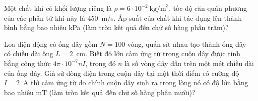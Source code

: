 	\begin{ex}%
		Một chất khí có khối lượng riêng là $\rho=6\cdot 10^{-2}~\text{kg/m}^3$, tốc độ căn quân phương của các phân tử khí này là $450$~m/s. Áp suất của chất khí tác dụng lên thành bình bằng bao nhiêu kPa (làm tròn kết quả đến chữ số hàng phần trăm)?
		\par
	\end{ex}

	\begin{ex}%
		Loa điện động có ống dây gồm $N=100$ vòng, quấn sít nhau tạo thành ống dây có chiều dài ống $L=2$~cm. Biết độ lớn cảm ứng từ trong cuộn dây được tính bằng công thức $4\pi\cdot 10^{-7}nI$, trong đó $n$ là số vòng dây dẫn trên một mét chiều dài của ống dây. Giả sử dòng điện trong cuộn dây tại một thời điểm có cường độ $I=2$~A thì cảm ứng từ do chính cuộn dây sinh ra trong lòng nó có độ lớn bằng bao nhiêu mT (làm tròn kết quả đến chữ số hàng phần mười)?
		\par
	\end{ex}

